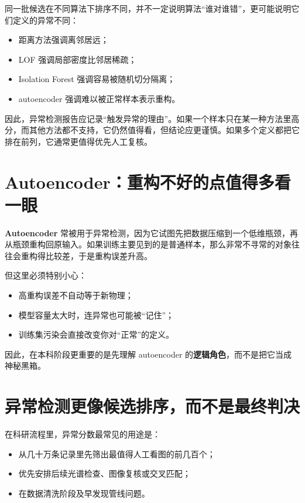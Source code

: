 同一批候选在不同算法下排序不同，并不一定说明算法“谁对谁错”，更可能说明它们定义的异常不同：

\begin{itemize}
    \item 距离方法强调离邻居远；
    \item LOF 强调局部密度比邻居稀疏；
    \item Isolation Forest 强调容易被随机切分隔离；
    \item autoencoder 强调难以被正常样本表示重构。
\end{itemize}

因此，异常检测报告应记录“触发异常的理由”。如果一个样本只在某一种方法里高分，而其他方法都不支持，它仍然值得看，但结论应更谨慎。如果多个定义都把它排在前列，它通常更值得优先人工复核。

\section{Autoencoder：重构不好的点值得多看一眼}

\textbf{Autoencoder} 常被用于异常检测，因为它试图先把数据压缩到一个低维瓶颈，再从瓶颈重构回原输入。如果训练主要见到的是普通样本，那么非常不寻常的对象往往会重构得比较差，于是重构误差升高。

但这里必须特别小心：

\begin{itemize}
    \item 高重构误差不自动等于新物理；
    \item 模型容量太大时，连异常也可能被“记住”；
    \item 训练集污染会直接改变你对“正常”的定义。
\end{itemize}

因此，在本科阶段更重要的是先理解 autoencoder 的\textbf{逻辑角色}，而不是把它当成神秘黑箱。

\section{异常检测更像候选排序，而不是最终判决}

在科研流程里，异常分数最常见的用途是：

\begin{itemize}
    \item 从几十万条记录里先筛出最值得人工看图的前几百个；
    \item 优先安排后续光谱检查、图像复核或交叉匹配；
    \item 在数据清洗阶段及早发现管线问题。
\end{itemize}

